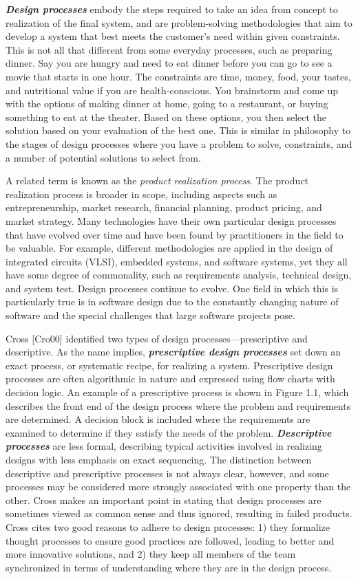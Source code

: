 \documentclass[a4paper,10pt]{book}
\begin{document}
\emph{\textbf{Design processes}} embody the steps required to take an
idea from concept to realization of the final system, and are
problem-solving methodologies that aim to develop a system that best
meets the customer's need within given constraints. This is not all that
different from some everyday processes, such as preparing dinner. Say
you are hungry and need to eat dinner before you can go to see a movie
that starts in one hour. The constraints are time, money, food, your
tastes, and nutritional value if you are health-conscious. You
brainstorm and come up with the options of making dinner at home, going
to a restaurant, or buying something to eat at the theater. Based on
these options, you then select the solution based on your evaluation of
the best one. This is similar in philosophy to the stages of design
processes where you have a problem to solve, constraints, and a number
of potential solutions to select from.

A related term is known as the \emph{product realization process}. The
product realization process is broader in scope, including aspects such
as entrepreneurship, market research, financial planning, product
pricing, and market strategy. Many technologies have their own
particular design processes that have evolved over time and have been
found by practitioners in the field to be valuable. For example,
different methodologies are applied in the design of integrated circuits
(VLSI), embedded systems, and software systems, yet they all have some
degree of commonality, such as requirements analysis, technical design,
and system test. Design processes continue to evolve. One field in which
this is particularly true is in software design due to the constantly
changing nature of software and the special challenges that large
software projects pose.

Cross {[}Cro00{]} identified two types of design
processes---prescriptive and descriptive. As the name implies,
\emph{\textbf{prescriptive design processes}} set down an exact process,
or systematic recipe, for realizing a system. Prescriptive design
processes are often algorithmic in nature and expressed using flow
charts with decision logic. An example of a prescriptive process is
shown in Figure 1.1, which describes the front end of the design process
where the problem and requirements are determined. A decision block is
included where the requirements are examined to determine if they
satisfy the needs of the problem. \emph{\textbf{Descriptive processes}}
are less formal, describing typical activities involved in realizing
designs with less emphasis on exact sequencing. The distinction between
descriptive and prescriptive processes is not always clear, however, and
some processes may be considered more strongly associated with one
property than the other. Cross makes an important point in stating that
design processes are sometimes viewed as common sense and thus ignored,
resulting in failed products. Cross cites two good reasons to adhere to
design processes: 1) they formalize thought processes to ensure good
practices are followed, leading to better and more innovative solutions,
and 2) they keep all members of the team synchronized in terms of
understanding where they are in the design process.
\end{document}
